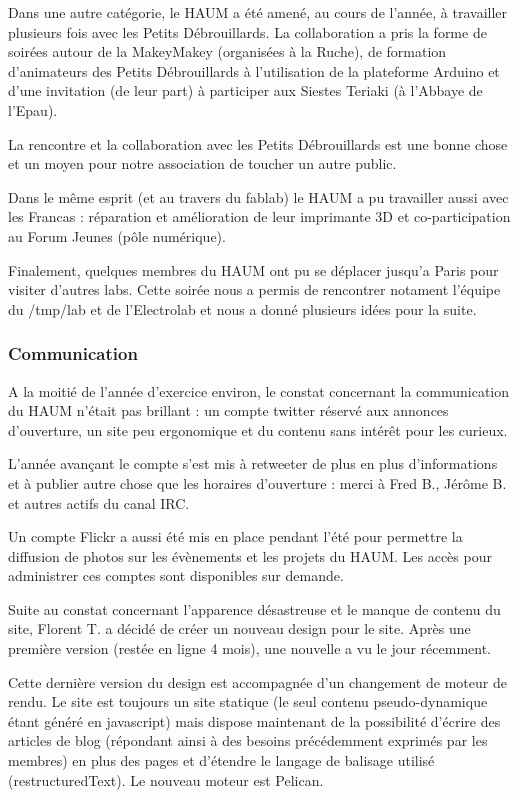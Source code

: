 \documentclass[11pt]{article}
\begin{document}
Dans une autre catégorie, le HAUM a été amené, au cours de l'année, à travailler plusieurs fois avec les Petits Débrouillards. La collaboration a pris la forme de soirées autour de la MakeyMakey (organisées à la Ruche), de formation d'animateurs des Petits Débrouillards à l'utilisation de la plateforme Arduino et d'une invitation (de leur part) à participer aux Siestes Teriaki (à l'Abbaye de l'Epau).

La rencontre et la collaboration avec les Petits Débrouillards est une bonne chose et un moyen pour notre association de toucher un autre public.

Dans le même esprit (et au travers du fablab) le HAUM a pu travailler aussi avec les Francas : réparation et amélioration de leur imprimante 3D et co-participation au Forum Jeunes (pôle numérique).

Finalement, quelques membres du HAUM ont pu se déplacer jusqu'a Paris pour visiter d'autres labs. Cette soirée nous a permis de rencontrer notament l'équipe du /tmp/lab et de l'Electrolab et nous a donné plusieurs idées pour la suite.
    
\subsubsection{Communication}

A la moitié de l'année d'exercice environ, le constat concernant la communication du HAUM n'était pas brillant : un compte twitter réservé aux annonces d'ouverture, un site peu ergonomique et du contenu sans intérêt pour les curieux.

L'année avançant le compte s'est mis à retweeter de plus en plus d'informations et à publier autre chose que les horaires d'ouverture : merci à Fred B., Jérôme B. et autres actifs du canal IRC.

Un compte Flickr a aussi été mis en place pendant l'été pour permettre la diffusion de photos sur les évènements et les projets du HAUM. Les accès pour administrer ces comptes sont disponibles sur demande.

Suite au constat concernant l'apparence désastreuse et le manque de contenu du site, Florent T. a décidé de créer un nouveau design pour le site. Après une première version (restée en ligne 4 mois), une nouvelle a vu le jour récemment.

Cette dernière version du design est accompagnée d'un changement de moteur de rendu. Le site est toujours un site statique (le seul contenu pseudo-dynamique étant généré en javascript) mais dispose maintenant de la possibilité d'écrire des articles de blog (répondant ainsi à des besoins précédemment exprimés par les membres) en plus des pages et d'étendre le langage de balisage utilisé (restructuredText). Le nouveau moteur est Pelican.
\end{document}
